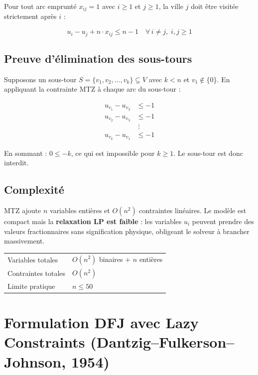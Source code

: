 \documentclass[12pt, a4paper]{article}
\begin{document}
Pour tout arc emprunté $x_{ij} = 1$ avec $i \geq 1$ et $j \geq 1$, la ville $j$
doit être visitée strictement après $i$ :

\begin{equation}
  u_i - u_j + n \cdot x_{ij} \leq n - 1 \quad \forall\, i \neq j,\; i,j \geq 1
\end{equation}

\subsection{Preuve d'élimination des sous-tours}

Supposons un sous-tour $S = \{v_1, v_2, \ldots, v_k\} \subsetneq V$ avec $k < n$
et $v_1 \notin \{0\}$. En appliquant la contrainte MTZ à chaque arc du sous-tour :

\begin{align*}
  u_{v_1} - u_{v_2} &\leq -1 \\
  u_{v_2} - u_{v_3} &\leq -1 \\
  &\;\vdots \\
  u_{v_k} - u_{v_1} &\leq -1
\end{align*}

En sommant : $0 \leq -k$, ce qui est impossible pour $k \geq 1$.
Le sous-tour est donc interdit.

\subsection{Complexité}

MTZ ajoute $n$ variables entières et $O(n^2)$ contraintes linéaires.
Le modèle est compact mais la \textbf{relaxation LP est faible} : les variables $u_i$
peuvent prendre des valeurs fractionnaires sans signification physique,
obligeant le solveur à brancher massivement.

\begin{center}
\begin{tabular}{ll}
  \toprule
  Variables totales    & $O(n^2)$ binaires $+$ $n$ entières \\
  Contraintes totales  & $O(n^2)$ \\
  Limite pratique      & $n \leq 50$ \\
  \bottomrule
\end{tabular}
\end{center}

\section{Formulation DFJ avec Lazy Constraints (Dantzig--Fulkerson--Johnson, 1954)}
\end{document}

